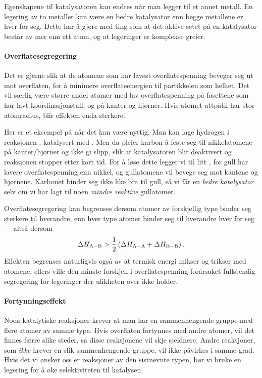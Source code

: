 Egenskapene til katalysatoren kan endres når man legger til et annet metall. En legering av to metaller kan være en bedre katalysator enn begge metallene er hver for seg. Dette har å gjøre med ting som at det aktive setet på en katalysator består av mer enn ett atom, og at legeringer er komplekse greier.

\paragraph{Overflatesegregering} Det er gjerne slik at de atomene som har lavest overflatespenning beveger seg ut mot overflaten, for å minimere overflateenergien til partikkelen som helhet. Det vil særlig være større andel atomer med lav overflatespenning på fasettene som har lavt koordinasjonstall, og på kanter og hjørner. Hvis atomet attpåtil har stor atomradius, blir effekten enda sterkere.

Her er et eksempel på når det kan være nyttig. Man kan lage hydrogen i reaksjonen , katalysert med . Men da pleier karbon å feste seg til nikkelatomene på kanter/hjørner og ikke gi slipp, slik at katalysatoren blir deaktivert og reaksjonen stopper etter kort tid. For å løse dette legger vi til litt , for gull har lavere overflatespenning enn nikkel, og gullatomene vil bevege seg mot kantene og hjørnene. Karbonet binder seg ikke like bra til gull, så vi får en \emph{bedre katalysator} selv om vi har lagt til noen \emph{mindre reaktive} gullatomer.

Overflatesegregering kan begrenses dersom atomer av forskjellig type binder seg sterkere til hverandre, enn hver type atomer binder seg til hverandre hver for seg --- altså dersom
\begin{equation}
	\Delta H_{\ce{A-B}} > \frac{1}{2}\left(\Delta H_{\ce{A-A}} + \Delta H_{\ce{B-B}}\right).
\end{equation}
Effekten begrenses naturligvis også av at termisk energi mikser og trikser med atomene, ellers ville den minste forskjell i overflatespenning forårsaket fullstendig segregering for legeringer der ulikheten over ikke holder.

\paragraph{Fortynningseffekt} Noen katalytiske reaksjoner krever at man har en sammenhengende gruppe med flere atomer av samme type. Hvis overflaten fortynnes med andre atomer, vil det finnes færre slike steder, så disse reaksjonene vil skje sjeldnere. Andre reaksjoner, som \emph{ikke} krever en slik sammenhengende gruppe, vil ikke påvirkes i samme grad. Hvis det vi ønsker oss er reaksjoner av den sistnevnte typen, bør vi bruke en legering for å øke selektiviteten til katalysen.

